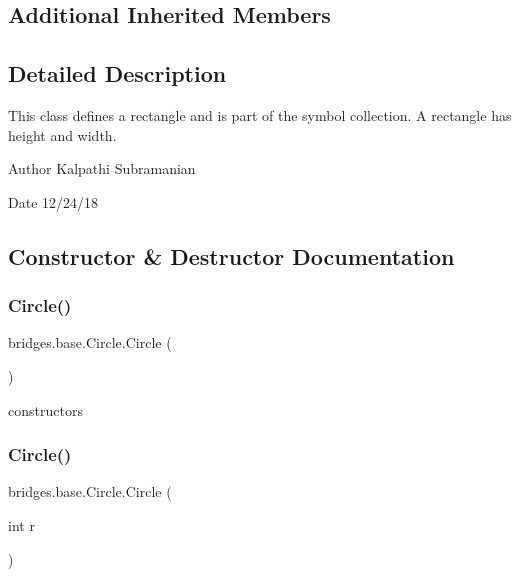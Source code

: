 \subsection*{Additional Inherited Members}


\subsection{Detailed Description}
This class defines a rectangle and is part of the symbol collection. A rectangle has height and width. 

\begin{DoxyAuthor}{Author}
Kalpathi Subramanian 
\end{DoxyAuthor}
\begin{DoxyDate}{Date}
12/24/18 
\end{DoxyDate}


\subsection{Constructor \& Destructor Documentation}
\mbox{\label{classbridges_1_1base_1_1_circle_a807231dff01120041d7d209d049e3029}} 
\subsubsection{\texorpdfstring{Circle()}{Circle()}\hspace{0.1cm}{\footnotesize\ttfamily [1/3]}}
{\footnotesize\ttfamily bridges.\+base.\+Circle.\+Circle (\begin{DoxyParamCaption}{ }\end{DoxyParamCaption})}

constructors \mbox{\label{classbridges_1_1base_1_1_circle_abfd82d0ca10193a51234657253051beb}} 
\subsubsection{\texorpdfstring{Circle()}{Circle()}\hspace{0.1cm}{\footnotesize\ttfamily [2/3]}}
{\footnotesize\ttfamily bridges.\+base.\+Circle.\+Circle (\begin{DoxyParamCaption}\item[{int}]{r }\end{DoxyParamCaption})}

